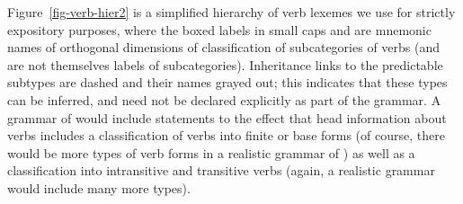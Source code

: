 \documentclass[output=paper,biblatex,babelshorthands,newtxmath,draftmode,colorlinks,citecolor=brown]{langscibook}
\begin{document}

Figure~\ref{fig-verb-hier2} is a simplified  hierarchy of verb lexemes we use for strictly expository purposes, where the boxed labels in small caps  and  are mnemonic names of orthogonal dimensions of classification  of subcategories of verbs (and are not themselves labels of subcategories). Inheritance links to the predictable subtypes are dashed and their names grayed out; this indicates that these types can be inferred, and need not be declared explicitly as part of the grammar. A grammar of  would include statements to the effect that head information about verbs includes a classification of verbs into finite or base forms (of course, there would be more types of verb forms in a realistic grammar of ) as well as a classification into intransitive and transitive verbs (again, a realistic grammar would include many more types).
\end{document}
